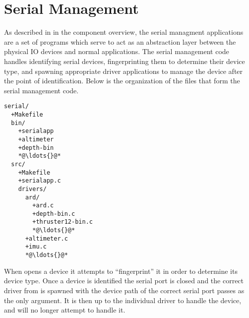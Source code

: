 
\newpage
\section{Serial Management} \label{serial}
As described in  in the component
overview, the serial managment applications are a set of programs which serve to
act as an abstraction layer between the physical IO devices and normal
applications. The serial management code handles identifying serial devices,
fingerprinting them to determine their device type, and spawning appropriate
driver applications to manage the device after the point of
identification. Below is the organization of the files that form the serial
management code.

\begin{lstlisting}[language=FileList, caption=Serial directory structure, escapeinside={{*@}{@*}}]
serial/
  +Makefile
  bin/
    +serialapp
    +altimeter
    +depth-bin
    *@\ldots{}@*
  src/
    +Makefile
    +serialapp.c
    drivers/
      ard/
        +ard.c
        +depth-bin.c
        +thruster12-bin.c
        *@\ldots{}@*
      +altimeter.c
      +imu.c
      *@\ldots{}@*
\end{lstlisting}

When  opens a device it attempts to ``fingerprint'' it in order
to determine its device type. Once a device is identified the serial port is
closed and the correct driver from is spawned with the device path of the
correct serial port passes as the only argument. It is then up to the individual
driver to handle the device, and  will no longer attempt to
handle it.

